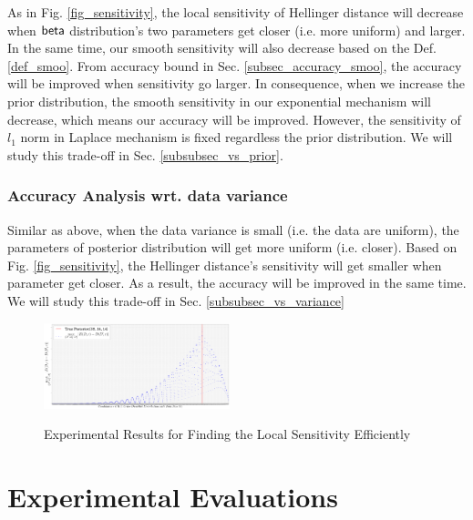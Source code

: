 \documentclass[sigconf, anonymous]{acmart}
\begin{document}
As in Fig. \ref{fig_sensitivity}, the local sensitivity of Hellinger distance will decrease when $\mathsf{beta}$ distribution's two parameters get closer (i.e. more uniform) and larger. In the same time, our smooth sensitivity will also decrease based on the Def. \ref{def_smoo}. From accuracy bound in Sec. \ref{subsec_accuracy_smoo}, the accuracy will be improved when sensitivity go larger. In consequence, when we increase the prior distribution, the smooth sensitivity in our exponential mechanism will decrease, which means our accuracy will be improved. However, the sensitivity of $l_1$ norm in Laplace mechanism is fixed regardless the prior distribution. We will study this trade-off in Sec. \ref{subsubsec_vs_prior}.

\subsubsection{Accuracy Analysis wrt. data variance}

Similar as above, when the data variance is small (i.e. the data are uniform), the parameters of posterior distribution will get more uniform (i.e. closer). Based on Fig. \ref{fig_sensitivity}, the Hellinger distance's sensitivity will get smaller when parameter get closer. As a result, the accuracy will be improved in the same time. We will study this trade-off in Sec. \ref{subsubsec_vs_variance}


\begin{figure}[ht]
\centering
\includegraphics[width=0.48\textwidth]{efficiency}
\label{fig_efficiency}
\caption{Experimental Results for Finding the Local Sensitivity Efficiently}
\end{figure}


\section{Experimental Evaluations}
\label{sec_experiment}
\end{document}
